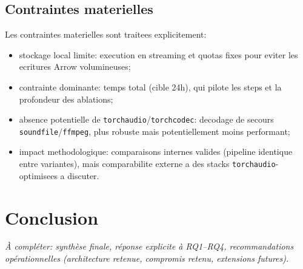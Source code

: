 \documentclass[11pt,a4paper]{article}
\begin{document}
\subsection{Contraintes materielles}
Les contraintes materielles sont traitees explicitement:
\begin{itemize}
\item stockage local limite: execution en streaming et quotas fixes pour eviter les ecritures Arrow volumineuses;
\item contrainte dominante: temps total (cible 24h), qui pilote les steps et la profondeur des ablations;
\item absence potentielle de \texttt{torchaudio}/\texttt{torchcodec}: decodage de secours \texttt{soundfile}/\texttt{ffmpeg}, plus robuste mais potentiellement moins performant;
\item impact methodologique: comparaisons internes valides (pipeline identique entre variantes), mais comparabilite externe a des stacks \texttt{torchaudio}-optimisees a discuter.
\end{itemize}
\section{Conclusion}
\textit{À compléter: synthèse finale, réponse explicite à RQ1--RQ4, recommandations opérationnelles (architecture retenue, compromis retenu, extensions futures).}
\end{document}
